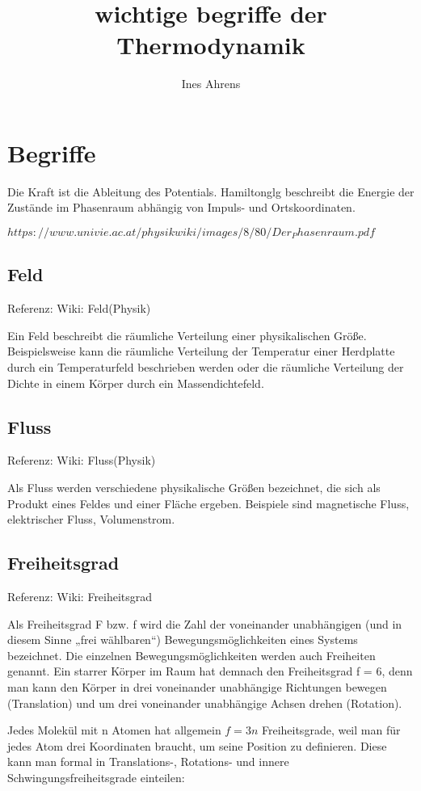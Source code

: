 \documentclass[]{article}
\title{wichtige begriffe der Thermodynamik}
\author{Ines Ahrens}
\begin{document}
\maketitle



\section{Begriffe}

Die Kraft ist die Ableitung des Potentials.
Hamiltonglg beschreibt die Energie der Zustände im Phasenraum abhängig von Impuls- und Ortskoordinaten.

$https://www.univie.ac.at/physikwiki/images/8/80/Der_Phasenraum.pdf$

\subsection{Feld}
Referenz: Wiki: Feld(Physik)

Ein Feld beschreibt die räumliche Verteilung einer physikalischen Größe. Beispielsweise kann die räumliche Verteilung der Temperatur einer Herdplatte durch ein Temperaturfeld beschrieben werden oder die räumliche Verteilung der Dichte in einem Körper durch ein Massendichtefeld.

\subsection{Fluss}
Referenz: Wiki: Fluss(Physik) 

Als Fluss werden verschiedene physikalische Größen bezeichnet, die sich als Produkt eines Feldes und einer Fläche ergeben. Beispiele sind magnetische Fluss, elektrischer Fluss, Volumenstrom. 

\subsection{Freiheitsgrad}
Referenz: Wiki: Freiheitsgrad

Als Freiheitsgrad F bzw. f wird die Zahl der voneinander unabhängigen (und in diesem Sinne „frei wählbaren“) Bewegungsmöglichkeiten eines Systems bezeichnet. Die einzelnen Bewegungsmöglichkeiten werden auch Freiheiten genannt. Ein starrer Körper im Raum hat demnach den Freiheitsgrad f = 6, denn man kann den Körper in drei voneinander unabhängige Richtungen bewegen (Translation) und um drei voneinander unabhängige Achsen drehen (Rotation).

Jedes Molekül mit n Atomen hat allgemein $f = 3n$ Freiheitsgrade, weil man für jedes Atom drei Koordinaten braucht, um seine Position zu definieren. Diese kann man formal in Translations-, Rotations- und innere Schwingungsfreiheitsgrade einteilen:
\end{document}
